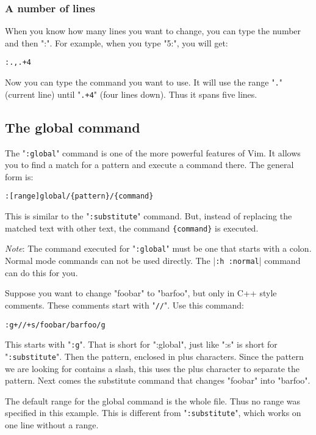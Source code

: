 \subsubsection{A number of lines}
When you know how many lines you want to change, you can type the number and then ":".
For example, when you type "5:", you will get:

\begin{Verbatim}[samepage=true]
 :.,.+4
\end{Verbatim}

Now you can type the command you want to use.
It will use the range "\texttt{.}" (current line) until "\texttt{.+4}" (four lines down).
Thus it spans five lines.

\subsection{The global command}
The "\texttt{:global}" command is one of the more powerful features of Vim.
It allows you to find a match for a pattern and execute a command there.
The general form is:

\begin{Verbatim}[samepage=true]
 :[range]global/{pattern}/{command}
\end{Verbatim}

This is similar to the "\texttt{:substitute}" command.
But, instead of replacing the matched text with other text, the command \texttt{\{command\}} is executed.

\emph{Note}:
The command executed for "\texttt{:global}" must be one that starts with a colon.
Normal mode commands can not be used directly.
The |\texttt{:h :normal}| command can do this for you.

Suppose you want to change "foobar" to "barfoo", but only in C++ style comments.
These comments start with "\texttt{//}".
Use this command:

\begin{Verbatim}[samepage=true]
 :g+//+s/foobar/barfoo/g
\end{Verbatim}

This starts with "\texttt{:g}".
That is short for ":global", just like ":s" is short for "\texttt{:substitute}".
Then the pattern, enclosed in plus characters.
Since the pattern we are looking for contains a slash, this uses the plus character to separate the pattern.
Next comes the substitute command that changes "foobar" into "barfoo".

The default range for the global command is the whole file.
Thus no range was specified in this example.
This is different from "\texttt{:substitute}", which works on one line without a range.

